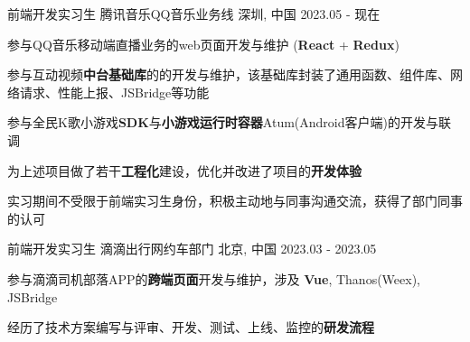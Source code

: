 

\begin{cventries}
    \cventry
    {前端开发实习生} %
    {腾讯音乐\hspace{2mm}QQ音乐业务线} %
    {深圳, 中国} %
    {2023.05 - 现在} %
    {
        \begin{cvitems} %
            \item {参与QQ音乐移动端直播业务的web页面开发与维护 (\textbf{React} + \textbf{Redux})}
            \item {参与互动视频\textbf{中台基础库}的的开发与维护，该基础库封装了通用函数、组件库、网络请求、性能上报、JSBridge等功能}
            \item {参与全民K歌小游戏\textbf{SDK}与\textbf{小游戏运行时容器}Atum(Android客户端)的开发与联调}
            \item {为上述项目做了若干\textbf{工程化}建设，优化并改进了项目的\textbf{开发体验}}
            \item {实习期间不受限于前端实习生身份，积极主动地与同事沟通交流，获得了部门同事的认可}
        \end{cvitems}
    }

    \cventry
    {前端开发实习生} %
    {滴滴出行\hspace{2mm}网约车部门} %
    {北京, 中国} %
    {2023.03 - 2023.05} %
    {
        \begin{cvitems} %
            \item {参与滴滴司机部落APP的\textbf{跨端页面}开发与维护，涉及 \textbf{Vue}, Thanos(Weex), JSBridge }
            \item {经历了技术方案编写与评审、开发、测试、上线、监控的\textbf{研发流程}}
        \end{cvitems}
    }
\end{cventries}
